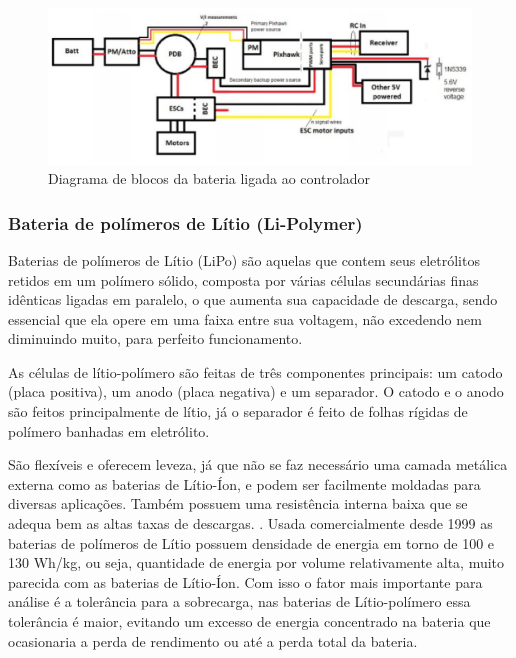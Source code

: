 \begin{figure}[H]
    \centering
	\includegraphics[keepaspectratio=true,scale=0.6]{figuras/esquemabateria.eps}
    \caption{Diagrama de blocos da bateria ligada ao controlador}
    \label{fig:esquemabateria}
\end{figure}


\subsubsection{Bateria de polímeros de Lítio (Li-Polymer)}

Baterias de polímeros de Lítio (LiPo) são aquelas que contem seus eletrólitos retidos em um polímero sólido, 
composta por várias células secundárias finas idênticas ligadas em paralelo, o que aumenta sua capacidade de 
descarga, sendo essencial que ela opere em uma faixa entre sua voltagem, não excedendo nem diminuindo muito, para perfeito funcionamento. \cite{gibbs}

As células de lítio-polímero são feitas de três componentes principais: um catodo (placa positiva), um anodo 
(placa negativa) e um separador. O catodo e o anodo são feitos principalmente de lítio, já o separador é feito 
de folhas rígidas de polímero banhadas em eletrólito. \cite{gibbs}

São flexíveis e oferecem leveza, já que não se faz necessário uma camada metálica externa como as baterias de 
Lítio-Íon, e podem ser facilmente moldadas para diversas aplicações. Também possuem uma resistência interna 
baixa que se adequa bem as altas taxas de descargas. \cite{costa}. Usada comercialmente desde 1999 as baterias 
de polímeros de Lítio possuem densidade de energia em torno de 100 e 130 Wh/kg, ou seja, quantidade de energia 
por volume relativamente alta, muito parecida com as baterias de Lítio-Íon. Com isso o fator mais importante para
análise é a tolerância para a sobrecarga, nas baterias de Lítio-polímero essa tolerância é maior, evitando um 
excesso de energia concentrado na bateria que ocasionaria a perda de rendimento ou até a perda total da bateria.
\cite{costa}

